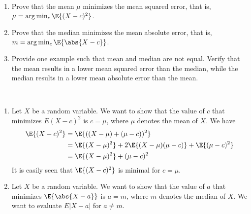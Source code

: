 	\begin{exercise}\label{ex:chap06:mu c}~
		\begin{enumerate}
			\item Prove that the mean $\mu$ minimizes the mean squared error, that is, $\mu = \arg \min_c \E{(X - c)^2}$.
			\item Prove that the median minimizes the mean absolute error, that is, $m = \arg \min_c \E{\abs{X - c}}$.
			\item Provide one example such that mean and median are not equal. Verify that the mean results in a lower mean squared error than the median, while the median results in a lower mean absolute error than the mean. 
		\end{enumerate}
		\begin{solution}~
			\begin{enumerate}
				\item Let $X$ be a random variable. We want to show that the value of $c$ that minimizes $E(X - c)^2$ is $c = \mu$, where $\mu$ denotes the mean of $X$. We have
				\begin{align*}
					\E{(X - c)^2} & = \E{((X - \mu) + (\mu - c))^2} \\
					& = \E{(X - \mu)^2} + 2 \E{(X - \mu)(\mu - c)} + \E{(\mu - c)^2} \\
					& = \E{(X - \mu)^2} + (\mu - c)^2
				\end{align*}
				It is easily seen that $\E{(X - c)^2}$ is minimal for $c = \mu$.
				\item Let $X$ be a random variable. We want to show that the value of $a$ that minimizes $\E{\abs{X - a}}$ is $a = m$, where $m$ denotes the median of $X$. We want to evaluate $E|X - a|$ for $a \neq m$.
					

\end{enumerate}
\end{solution}
\end{exercise}
